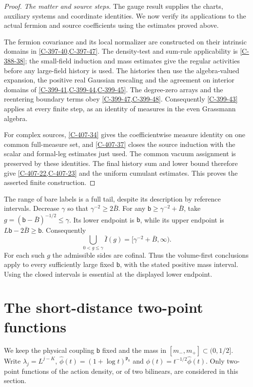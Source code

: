 \documentclass[11pt,letterpaper,reqno]{amsart}
\theoremstyle{definition}
\theoremstyle{remark}
\begin{document}
\begin{proof}
\emph{The matter and source steps.}
The gauge result supplies the charts, auxiliary systems and
coordinate identities. We now verify its applications to
the actual fermion and source coefficients using the
estimates proved above.

The fermion covariance and its local normalizer are constructed
on their intrinsic domains in \cref{C-397-40,C-397-47}.
The density-test and sum-rule applicability is
\cref{C-388-38}; the small-field induction and mass estimates
give the regular activities before any large-field history
is used. The histories then use the algebra-valued expansion,
the positive real Gaussian rescaling and the agreement on
interior domains of \cref{C-399-41,C-399-44,C-399-45}.
The degree-zero arrays and the reentering boundary terms obey
\cref{C-399-47,C-399-48}. Consequently \cref{C-399-43}
applies at every finite step, as an identity of measures in
the even Grassmann algebra.

For complex sources, \cref{C-407-34} gives the coefficientwise
measure identity on one common full-measure set, and
\cref{C-407-37} closes the source induction with the scalar
and formal-leg estimates just used. The common vacuum
assignment is preserved by these identities. The final
history sum and lower bound therefore give
\cref{C-407-22,C-407-23} and the uniform cumulant estimates.
This proves the asserted finite construction.
\end{proof}

The range of bare labels is a full tail, despite its
description by reference intervals. Decrease $\gamma$ so
that $\gamma^{-2}\ge2\bar B$. For any
$\mathsf b\ge\gamma^{-2}+\bar B$, take
$g=(\mathsf b-\bar B)^{-1/2}\le\gamma$.
Its lower endpoint is $\mathsf b$, while its upper endpoint
is $L\mathsf b-2\bar B\ge\mathsf b$.
Consequently
\[
 \bigcup_{0<g\le\gamma}\bar I(g)
        =[\gamma^{-2}+\bar B,\infty).
\]
For each such $g$ the admissible sides are cofinal.
Thus the volume-first conclusions apply to every
sufficiently large fixed $\mathsf b$, with the stated
positive mass interval. Using the closed intervals is
essential at the displayed lower endpoint.

\section{The short-distance two-point functions}
\label{sec:qcd-two-point-laws}

We keep the physical coupling $\mathsf b$ fixed and the mass in
$[m_-,m_+]\subset(0,1/2]$. Write
$\lambda_j=L^{j-K}$, $\widehat\phi(t)=(1+\log t)^{\mathfrak p_0}$
and $\phi(t)=t^{-1/2}\widehat\phi(t)$.
Only two-point functions of the action density, or of two bilinears,
are considered in this section.
\end{document}
